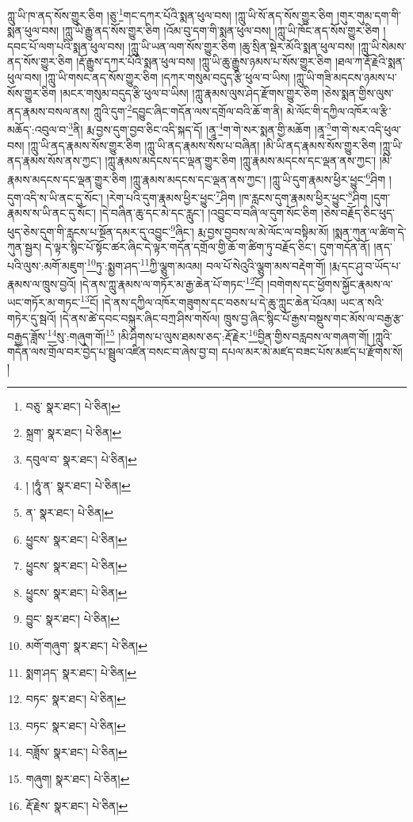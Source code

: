 ཀླུ་ཡི་ཁ་ནད་སོས་གྱུར་ཅིག །ཅུ་\footnote{བཅུ་  སྣར་ཐང་།  པེ་ཅིན། }གང་དཀར་པོའི་སྨན་ཕུལ་བས། །ཀླུ་ཡི་སོ་ནད་སོས་གྱུར་ཅིག །གུར་གུམ་དག་གི་སྨན་ཕུལ་བས། །ཀླུ་ཡི་རྒྱུ་ནད་སོས་གྱུར་ཅིག །འོམ་བུ་དག་གི་སྨན་ཕུལ་བས། །ཀླུ་ཡི་ཁོང་ནད་སོས་གྱུར་ཅིག །དབང་པོ་ལག་པའི་སྨན་ཕུལ་བས། །ཀླུ་ཡི་ཡན་ལག་སོས་གྱུར་ཅིག །ཆུ་སྲིན་སྡེར་མོའི་སྨན་ཕུལ་བས། །ཀླུ་ཡི་སེམས་ནད་སོས་གྱུར་ཅིག །རྡོ་རྒྱུས་དཀར་པོའི་སྨན་ཕུལ་བས། །ཀླུ་ཡི་ཆུ་རྒྱུས་ཉམས་པ་སོས་གྱུར་ཅིག །ཐལ་ཀ་རྡོ་རྗེའི་སྨན་ཕུལ་བས། །ཀླུ་ཡི་གསང་ནད་སོས་གྱུར་ཅིག །དཀར་གསུམ་བདུད་རྩི་ཕུལ་བ་ཡིས། །ཀླུ་ཡི་གཟི་མདངས་ཉམས་པ་སོས་གྱུར་ཅིག །མངར་གསུམ་བདུད་རྩི་ཕུལ་བ་ཡིས། །ཀླུ་རྣམས་ལུས་ཤེད་རྫོགས་གྱུར་ཅིག །ཅེས་སྨན་གྱིས་ལུས་ནད་རྣམས་བསལ་ནས། ཀླུའི་དུག་\footnote{སྐྲག་  སྣར་ཐང་།  པེ་ཅིན། }དབྱུང་ཞིང་གདོན་ལས་དགྲོལ་བའི་ཆོ་ག་ནི། མེ་ལོང་གི་དཀྱིལ་འཁོར་ལ་རྩི་མཆོད་:འབུལ་བ་\footnote{དབུལ་བ་  སྣར་ཐང་།  པེ་ཅིན། }ནི། རྨ་བྱས་དུག་བྱབ་ཅིང་འདི་སྐད་དོ། །ནཱ་\footnote{། །ཧཱུཾ་ན་  སྣར་ཐང་།  པེ་ཅིན། }ག་གེ་སར་སྨན་གྱི་མཆོག །ནཱ་\footnote{ན་  སྣར་ཐང་།  པེ་ཅིན། }ག་གེ་སར་འདི་ཕུལ་བས། །ཀླུ་ཡི་ནད་རྣམས་སོས་གྱུར་ཅིག །ཀླུ་ཡི་ནད་རྣམས་སོས་པ་བཞིན། །མི་ཡི་ནད་རྣམས་སོས་གྱུར་ཅིག །ཀླུ་ཡི་ནད་རྣམས་སོས་ནས་ཀྱང་། །ཀླུ་རྣམས་མདངས་དང་ལྡན་གྱུར་ཅིག །ཀླུ་རྣམས་མདངས་དང་ལྡན་ནས་ཀྱང་། །མི་རྣམས་མདངས་དང་ལྡན་གྱུར་ཅིག །ཀླུ་རྣམས་མདངས་དང་ལྡན་ནས་ཀྱང་། །ཀླུ་ཡི་དུག་རྣམས་ཕྱིར་ཕྱུང་\footnote{ཕྱུངས་  སྣར་ཐང་།  པེ་ཅིན། }ཤིག །དུག་འདི་ས་ཡི་ནང་དུ་སོང་། །རེག་པའི་དུག་རྣམས་ཕྱིར་ཕྱུང་\footnote{ཕྱུངས་  སྣར་ཐང་།  པེ་ཅིན། }ཤིག །ཁ་རླངས་དུག་རྣམས་ཕྱིར་ཕྱུང་\footnote{ཕྱུངས་  སྣར་ཐང་།  པེ་ཅིན། }ཤིག །དུག་རྣམས་ས་ཡི་ནང་དུ་སོང་། །དེ་བཞིན་ཆུ་དང་མེ་དང་རླུང་། །འབྱུང་བ་བཞི་ལ་དུག་སོང་ཅིག །ཅེས་བརྗོད་ཅིང་ཕུད་ཕུད་ཅེས་དུག་གི་རླངས་པ་སྔོན་དམར་དུ་འབྱུང་\footnote{བྱུང་  སྣར་ཐང་།  པེ་ཅིན། }ཞིང་། རྨ་བྱས་བྱབས་ལ་མེ་ལོང་ལ་བསྟིམ་མོ། །སྨན་ཀུན་ལ་ཚིག་དེ་ཀུན་སྦྱར། དེ་ལྟར་སྙིང་པོ་སྟོང་ཚར་ཞིང་དེ་ལྟར་གདོན་དགྲོལ་གྱི་ཆོ་ག་ཚིག་ཏུ་བརྗོད་ཅིང་། དུག་གདོན་ནོ། །ནད་པའི་ལུས་:མགོ་མཇུག་\footnote{མགོ་གཞུག་  སྣར་ཐང་།  པེ་ཅིན། }ཏུ་:སྨྱག་ཤད་\footnote{སྨག་ཤད་  སྣར་ཐང་།  པེ་ཅིན། }ཀྱི་ལྕུག་མའམ། བལ་པོ་སེའུའི་ལྕུག་མས་བརྡེག་གོ། །རྨ་དང་ཤུ་བ་ཡོད་པ་རྣམས་ལ་ཁྲུས་བྱའོ། །དེ་ནས་ཀླུ་རྣམས་ལ་གཏོར་མ་རྒྱ་ཆེན་པོ་གཏང་\footnote{བཏང་  སྣར་ཐང་།  པེ་ཅིན། }ངོ། །བགེགས་དང་ཕྱོགས་སྐྱོང་རྣམས་ལ་ཡང་གཏོར་མ་གཏང་\footnote{བཏང་  སྣར་ཐང་།  པེ་ཅིན། }ངོ། །དེ་ནས་དཀྱིལ་འཁོར་གཟུགས་དང་བཅས་པ་དེ་ཆུ་ཀླུང་ཆེན་པོའམ། ཡང་ན་སའི་གཏེར་དུ་སྦའོ། །དེ་ནས་ཚེ་དབང་བསྐུར་ཞིང་བཀྲ་ཤིས་གསོལ། ཁྲུས་བྱ་ཞིང་སྙིང་པོ་རྒྱས་བསྡུས་གང་མོས་ལ་བརྒྱ་རྩ་བརྒྱད་ཟློས་\footnote{བཟློས་  སྣར་ཐང་།  པེ་ཅིན། }སུ་:གཞུག་གོ།\footnote{གཞུག།  སྣར་ཐང་།  པེ་ཅིན། } །མི་ཤིགས་པ་ལུས་ཐམས་ཅད་:རྡོ་རྗེར་\footnote{རྡོ་རྗེས་  སྣར་ཐང་།  པེ་ཅིན། }བྱིན་གྱིས་བརླབས་ལ་གཞག་གོ། །ཀླུའི་གདོན་ལས་གྲོལ་བར་བྱེད་པ་སྦྲུལ་འཛིན་བསང་བ་ཞེས་བྱ་བ། དཔལ་མར་མེ་མཛད་བཟང་པོས་མཛད་པ་རྫོགས་སོ། ། 